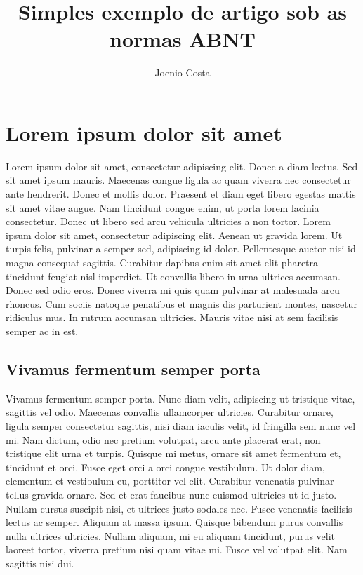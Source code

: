 \documentclass{abntex2}
\begin{document}
\title{Simples exemplo de artigo sob as normas ABNT}

\author{Joenio Costa}

\maketitle

\section{Lorem ipsum dolor sit amet}

Lorem ipsum dolor sit amet, consectetur adipiscing elit. Donec a diam lectus.
Sed sit amet ipsum mauris. Maecenas congue ligula ac quam viverra nec
consectetur ante hendrerit. Donec et mollis dolor. Praesent et diam eget
libero egestas mattis sit amet vitae augue. Nam tincidunt congue enim, ut
porta lorem lacinia consectetur. Donec ut libero sed arcu vehicula ultricies a
non tortor. Lorem ipsum dolor sit amet, consectetur adipiscing elit. Aenean ut
gravida lorem. Ut turpis felis, pulvinar a semper sed, adipiscing id dolor.
Pellentesque auctor nisi id magna consequat sagittis. Curabitur dapibus enim
sit amet elit pharetra tincidunt feugiat nisl imperdiet. Ut convallis libero
in urna ultrices accumsan. Donec sed odio eros. Donec viverra mi quis quam
pulvinar at malesuada arcu rhoncus. Cum sociis natoque penatibus et magnis dis
parturient montes, nascetur ridiculus mus. In rutrum accumsan ultricies.
Mauris vitae nisi at sem facilisis semper ac in est.

\subsection{Vivamus fermentum semper porta}

Vivamus fermentum semper porta. Nunc diam velit, adipiscing ut tristique
vitae, sagittis vel odio. Maecenas convallis ullamcorper ultricies. Curabitur
ornare, ligula semper consectetur sagittis, nisi diam iaculis velit, id
fringilla sem nunc vel mi. Nam dictum, odio nec pretium volutpat, arcu ante
placerat erat, non tristique elit urna et turpis. Quisque mi metus, ornare sit
amet fermentum et, tincidunt et orci. Fusce eget orci a orci congue
vestibulum. Ut dolor diam, elementum et vestibulum eu, porttitor vel elit.
Curabitur venenatis pulvinar tellus gravida ornare. Sed et erat faucibus nunc
euismod ultricies ut id justo. Nullam cursus suscipit nisi, et ultrices justo
sodales nec. Fusce venenatis facilisis lectus ac semper. Aliquam at massa
ipsum. Quisque bibendum purus convallis nulla ultrices ultricies. Nullam
aliquam, mi eu aliquam tincidunt, purus velit laoreet tortor, viverra pretium
nisi quam vitae mi. Fusce vel volutpat elit. Nam sagittis nisi dui.
\end{document}
